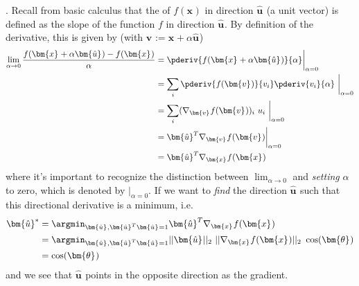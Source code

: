 \documentclass[11pt]{article}
\renewcommand\vec[2][]{\bm{#2}_{#1}}
\newcommand\myspace[1][]{\vspace{#1\bigskipamount}}
\begin{document}
\myspace
{}. Recall from basic calculus that the  of $f(\vec x)$ in direction $\vec{\hat{u}}$ (a unit vector) is defined as the slope of the function $f$ in direction $\vec{\hat u}$. By definition of the derivative, this is given by (with $\vec v := \vec x + \alpha \vec{\hat u}$)
\begin{align}
	\lim_{\alpha \rightarrow 0} \frac{f(\vec x + \alpha \vec{\hat u}) - f(\vec{x})   }{\alpha} &= \pderiv{f(\vec{x} + \alpha \vec{\hat u})}{\alpha} \bigg|_{\alpha=0} \\
	&= \sum_i \pderiv{f(\vec v)}{v_i}\pderiv{v_i}{\alpha} ~ \bigg|_{\alpha=0}  \\
	&= \sum_i (\nabla_{\vec v} f(\vec v))_i ~  u_i ~ \bigg|_{\alpha=0} \\
	&= \vec{\hat u}^T \nabla_{\vec v} f(\vec v) \bigg|_{\alpha=0} \\
	&= \vec{\hat u}^T \nabla_{\vec x} f(\vec x) \label{directional-deriv}
\end{align}
where it's important to recognize the distinction between $\lim_{\alpha \rightarrow 0}$ and \textit{setting} $\alpha$ to zero, which is denoted by $\big|_{\alpha=0}$. If we want to \textit{find} the direction $\vec{\hat u}$ such that this directional derivative is a minimum, i.e. 
\begin{align}
	\vec{\hat u}^* &= \argmin_{\vec{\hat u}, \vec{\hat u}^T \vec{\hat u} = 1} \vec{\hat u}^T \nabla_{\vec x} f(\vec x) \\
	&=  \argmin_{\vec{\hat u}, \vec{\hat u}^T \vec{\hat u} = 1} ||\vec{\hat u}||_2 ~ ||\nabla_{\vec x} f(\vec x)||_2 ~ \cos(\vec{\theta}) \\
	&= \cos(\vec{\theta})
\end{align}
and we see that $\vec{\hat u}$ points in the opposite direction as the gradient. 
\end{document}
